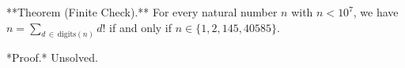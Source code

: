 
**Theorem (Finite Check).** For every natural number $n$ with $n < 10^7$, we have $n = \sum_{d \,\in\, \text{digits}(n)} d!$ if and only if $n \in \{1, 2, 145, 40585\}$.

*Proof.* Unsolved.
